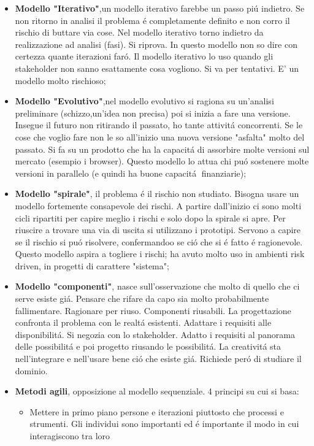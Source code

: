 \documentclass[10pt]{article}
\begin{document}
\begin{itemize}
\begin{itemize}
\begin{itemize}
	
	\item \textbf{Modello "Iterativo"},un modello iterativo farebbe un passo 
	pi\'u indietro. Se non ritorno in analisi il problema \'e completamente 
	definito e non corro il rischio di buttare via cose. Nel modello 
	iterativo torno indietro da realizzazione ad analisi (fasi). Si riprova. In 
	questo modello non so dire con certezza quante iterazioni far\'o.
	Il modello iterativo lo uso quando gli stakeholder non sanno esattamente 
	cosa vogliono. Si va per tentativi. E' un modello molto rischioso;
	
	
	\item \textbf{Modello "Evolutivo"},nel modello evolutivo si ragiona su 
	un'analisi preliminare (schizzo,un'idea non precisa) poi si inizia
	a fare una versione. Insegue il futuro non ritirando il passato, ho tante 
	attivit\'a concorrenti. Se le cose
	che voglio fare non le so all'inizio una nuova versione "asfalta" molto del 
	passato. Si fa su un prodotto che ha la capacit\'a di assorbire molte 
	versioni sul mercato (esempio i browser). Questo modello lo attua chi pu\'o 
	sostenere molte versioni in parallelo (e quindi ha buone 
	capacit\'a finanziarie);
	
	
	\item \textbf{Modello "spirale"}, il problema \'e il rischio non studiato. 
	Bisogna usare un modello fortemente consapevole dei rischi. A partire 
	dall'inizio ci sono molti cicli ripartiti per capire meglio i rischi e solo
	dopo la spirale si apre. Per riuscire a trovare una via di uscita si 
	utilizzano i prototipi. Servono a capire se il rischio si pu\'o risolvere, 
	confermandoo se ci\'o che si \'e fatto \'e ragionevole. Questo modello 
	aspira a togliere i rischi; ha avuto molto uso in ambienti risk driven, in 
	progetti di carattere "sistema";
	
	
	\item \textbf{Modello "componenti"}, nasce sull'osservazione che molto di 
	quello che ci serve esiste gi\'a. Pensare che rifare da capo sia molto 
	probabilmente fallimentare. Ragionare per riuso. Componenti riusabili.
	La progettazione confronta il problema con le realt\'a esistenti. Adattare 
	i requisiti alle disponibilit\'a. 
	Si negozia con lo stakeholder. Adatto i requisiti al panorama delle 
	possibilit\'a e poi progetto riusando le possibilit\'a. La creativit\'a sta 
	nell'integrare e nell'usare bene ci\'o che esiste gi\'a. Richiede per\'o di 
	studiare il dominio.
	
	
	\item \textbf{Metodi agili}, opposizione al modello sequenziale. 4 principi 
	su cui si basa:
	\begin{itemize}
	\item Mettere in primo piano persone e iterazioni piuttosto che processi e 
	strumenti. Gli individui sono importanti ed \'e importante il modo in cui 
	interagiscono tra loro
	

\end{itemize}
\end{itemize}
\end{itemize}
\end{itemize}
\end{document}
